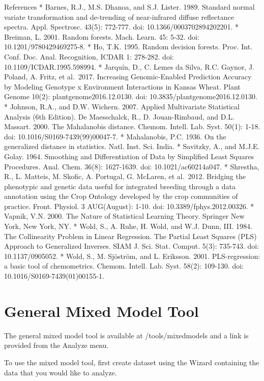 \documentclass[
  12pt,
]{book}
\begin{document}
References * Barnes, R.J., M.S. Dhanoa, and S.J. Lister. 1989. Standard normal variate transformation and de-trending of near-infrared diffuse reflectance spectra. Appl. Spectrosc. 43(5): 772-777. doi: 10.1366/0003702894202201. * Breiman, L. 2001. Random forests. Mach. Learn. 45: 5-32. doi: 10.1201/9780429469275-8. * Ho, T.K. 1995. Random decision forests. Proc. Int. Conf. Doc. Anal. Recognition, ICDAR 1: 278-282. doi: 10.1109/ICDAR.1995.598994. * Jarquín, D., C. Lemes da Silva, R.C. Gaynor, J. Poland, A. Fritz, et al.~2017. Increasing Genomic-Enabled Prediction Accuracy by Modeling Genotype x Environment Interactions in Kansas Wheat. Plant Genome 10(2): plantgenome2016.12.0130. doi: 10.3835/plantgenome2016.12.0130. * Johnson, R.A., and D.W. Wichern. 2007. Applied Multivariate Statistical Analysis (6th Edition). De Maesschalck, R., D. Jouan-Rimbaud, and D.L. Massart. 2000. The Mahalanobis distance. Chemom. Intell. Lab. Syst. 50(1): 1-18. doi: 10.1016/S0169-7439(99)00047-7. * Mahalanobis, P.C. 1936. On the generalized distance in statistics. Natl. Inst. Sci. India. * Savitzky, A., and M.J.E. Golay. 1964. Smoothing and Differentiation of Data by Simplified Least Squares Procedures. Anal. Chem. 36(8): 1627-1639. doi: 10.1021/ac60214a047. * Shrestha, R., L. Matteis, M. Skofic, A. Portugal, G. McLaren, et al.~2012. Bridging the phenotypic and genetic data useful for integrated breeding through a data annotation using the Crop Ontology developed by the crop communities of practice. Front. Physiol. 3 AUG(August): 1-10. doi: 10.3389/fphys.2012.00326. * Vapnik, V.N. 2000. The Nature of Statistical Learning Theory. Springer New York, New York, NY. * Wold, S., A. Ruhe, H. Wold, and W.J. Dunn, III. 1984. The Collinearity Problem in Linear Regression. The Partial Least Squares (PLS) Approach to Generalized Inverses. SIAM J. Sci. Stat. Comput. 5(3): 735-743. doi: 10.1137/0905052. * Wold, S., M. Sjöström, and L. Eriksson. 2001. PLS-regression: a basic tool of chemometrics. Chemom. Intell. Lab. Syst. 58(2): 109-130. doi: 10.1016/S0169-7439(01)00155-1.

\hypertarget{general-mixed-model-tool}{%
\section{General Mixed Model Tool}\label{general-mixed-model-tool}}

The general mixed model tool is available at /tools/mixedmodels and a link is provided from the Analyze menu.

To use the mixed model tool, first create dataset using the Wizard containing the data that you would like to analyze.
\end{document}
